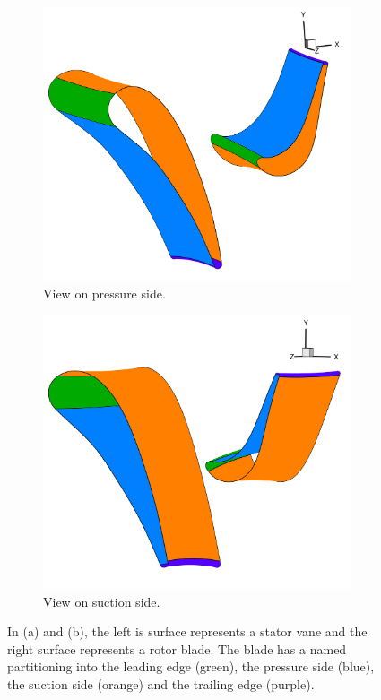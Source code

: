 \documentclass[a4paper, 11pt]{report}
\theoremstyle{definition}
\begin{document}
	\begin{figure}[H]
		\centering
		\begin{subfigure}{.49\textwidth}
			\includegraphics[width=\textwidth]{../tec/rotor_stator/11.png}
			\caption{View on pressure side.}
		\end{subfigure}
		\begin{subfigure}{.49\textwidth}
			\includegraphics[width=\textwidth]{../tec/rotor_stator/12.png}
			\caption{View on suction side.	}
		\end{subfigure}
		\caption{In (a) and (b), the left is surface represents a stator vane and the right surface represents a rotor blade. The blade has a named partitioning into the leading edge (green), the pressure side (blue), the suction side (orange) and the trailing edge (purple).}
		\label{fig:rotor_stator}
	\end{figure}
\end{document}
